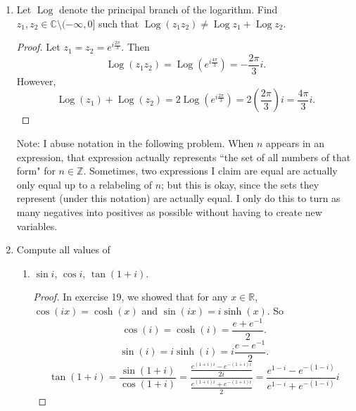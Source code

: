 \documentclass[10pt]{article}
\newcommand{\Z}{\mathbb{Z}}
\newcommand{\R}{\mathbb{R}}
\newcommand{\C}{\mathbb{C}}
\DeclareMathOperator*{\Log}{Log}
\begin{document}
\begin{enumerate}







\item Let $\Log$ denote the principal branch of the logarithm.  Find $z_1, z_2 \in \C \setminus (-\infty, 0]$ such that $\Log(z_1 z_2) \neq \Log z_1 + \Log z_2$.

\begin{proof}

Let $z_1 = z_2 = e^{i\frac{2\pi}{3}}$.  Then $$\Log(z_1z_2) = \Log(e^{i\frac{4\pi}{3}}) = -\frac{2\pi}{3}i.$$  However, $$\Log(z_1) + \Log(z_2) = 2\Log(e^{i\frac{2\pi}{3}}) = 2\left(\frac{2\pi}{3} \right)i = \frac{4\pi}{3}i.$$
\end{proof}










\noindent Note: I abuse notation in the following problem.  When $n$ appears in an expression, that expression actually represents ``the set of all numbers of that form" for $n \in \Z$.  Sometimes, two expressions I claim are equal are actually only equal up to a relabeling of $n$; but this is okay, since the sets they represent (under this notation) are actually equal.  I only do this to turn as many negatives into positives as possible without having to create new variables.
\item Compute all values of
\begin{enumerate}
\item $\sin i$, $\cos i$, $\tan(1+i)$.
\begin{proof}

In exercise 19, we showed that for any $x \in \R$, $\cos(ix) = \cosh(x)$ and $\sin(ix) = i \sinh(x)$.  So
$$
\cos(i) = \cosh(i) = \frac{e + e^{-1}}{2}.
$$
$$
\sin(i) = i\sinh(i) = i\frac{e - e^{-1}}{2}.
$$
$$
\tan(1+i) = \frac{\sin(1+i)}{\cos(1+i)} = 
\frac{\frac{e^{(1+i)i} - e^{-(1+i)i}}{2i}}{\frac{e^{(1+i)i} + e^{-(1+i)i}}{2}}
=
\frac{e^{1-i} - e^{-(1-i)}}{e^{1-i} + e^{-(1-i)}}i
$$


\end{proof}
\end{enumerate}
\end{enumerate}
\end{document}
